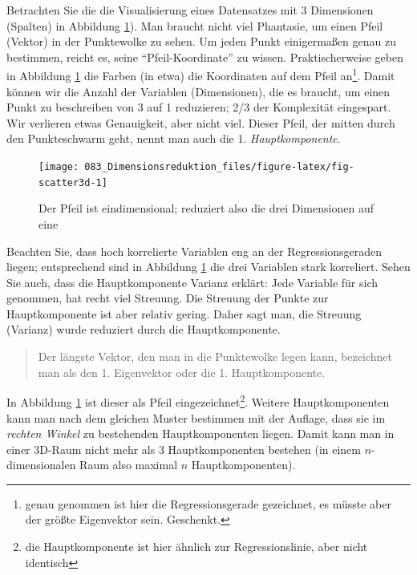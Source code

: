 \documentclass[12pt,ngerman,]{book}
\let\rmarkdownfootnote\footnote%
\def\footnote{\protect\rmarkdownfootnote}
\theoremstyle{definition}
\theoremstyle{definition}
\theoremstyle{remark}
\begin{document}
Betrachten Sie die die Visualisierung eines Datensatzes mit 3
Dimensionen (Spalten) in Abbildung \ref{fig:fig-scatter3d}). Man braucht
nicht viel Phantasie, um einen Pfeil (Vektor) in der Punktewolke zu
sehen. Um jeden Punkt einigermaßen genau zu bestimmen, reicht es, seine
``Pfeil-Koordinate'' zu wissen. Praktischerweise geben in Abbildung
\ref{fig:fig-scatter3d} die Farben (in etwa) die Koordinaten auf dem
Pfeil an\footnote{genau genommen ist hier die Regressionsgerade
  gezeichnet, es müsste aber der größte Eigenvektor sein. Geschenkt.}.
Damit können wir die Anzahl der Variablen (Dimensionen), die es braucht,
um einen Punkt zu beschreiben von 3 auf 1 reduzieren; 2/3 der
Komplexität eingespart. Wir verlieren etwas Genauigkeit, aber nicht
viel. Dieser Pfeil, der mitten durch den Punkteschwarm geht, nennt man
auch die 1. \emph{Hauptkomponente}.

\begin{figure}

{\centering \texttt{[image: 083\_Dimensionsreduktion\_files/figure-latex/fig-scatter3d-1]} 

}

\caption{Der Pfeil ist eindimensional; reduziert also die drei Dimensionen auf eine}\label{fig:fig-scatter3d}
\end{figure}

Beachten Sie, dass hoch korrelierte Variablen eng an der
Regressionsgeraden liegen; entsprechend sind in Abbildung
\ref{fig:fig-scatter3d} die drei Variablen stark korreliert. Sehen Sie
auch, dass die Hauptkomponente Varianz erklärt: Jede Variable für sich
genommen, hat recht viel Streuung. Die Streuung der Punkte zur
Hauptkomponente ist aber relativ gering. Daher sagt man, die Streuung
(Varianz) wurde reduziert durch die Hauptkomponente.

\begin{quote}
Der längste Vektor, den man in die Punktewolke legen kann, bezeichnet
man als den 1. Eigenvektor oder die 1. Hauptkomponente.
\end{quote}

In Abbildung \ref{fig:fig-scatter3d} ist dieser als Pfeil
eingezeichnet\footnote{die Hauptkomponente ist hier ähnlich zur
  Regressionslinie, aber nicht identisch}. Weitere Hauptkomponenten kann
man nach dem gleichen Muster bestimmen mit der Auflage, dass sie im
\emph{rechten Winkel} zu bestehenden Hauptkomponenten liegen. Damit kann
man in einer 3D-Raum nicht mehr als 3 Hauptkomponenten bestehen (in
einem \(n\)-dimensionalen Raum also maximal \(n\) Hauptkomponenten).
\end{document}
